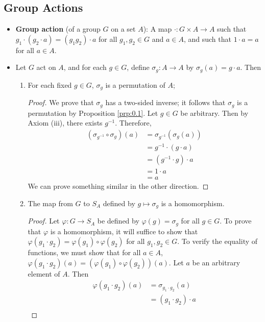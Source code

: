 \documentclass[../notes.tex]{subfiles}
\begin{document}
\subsection*{Group Actions}
\begin{itemize}
    \item \textbf{Group action} (of a group $G$ on a set $A$): A map $\cdot:G\times A\to A$ such that $g_1\cdot(g_2\cdot a)=(g_1g_2)\cdot a$ for all $g_1,g_2\in G$ and $a\in A$, and such that $1\cdot a=a$ for all $a\in A$.
    \item Let $G$ act on $A$, and for each $g\in G$, define $\sigma_g:A\to A$ by $\sigma_g(a)=g\cdot a$. Then
    \begin{enumerate}
        \item For each fixed $g\in G$, $\sigma_g$ is a permutation of $A$;
        \begin{proof}
            We prove that $\sigma_g$ has a two-sided inverse; it follows that $\sigma_g$ is a permutation by Proposition \ref{prp:0.1}. Let $g\in G$ be arbitrary. Then by Axiom (iii), there exists $g^{-1}$. Therefore,
            \begin{align*}
                (\sigma_{g^{-1}}\circ\sigma_g)(a) &= \sigma_{g^{-1}}(\sigma_g(a))\\
                &= g^{-1}\cdot(g\cdot a)\\
                &= (g^{-1}\cdot g)\cdot a\\
                &= 1\cdot a\\
                &= a
            \end{align*}
            We can prove something similar in the other direction.
        \end{proof}
        \item The map from $G$ to $S_A$ defined by $g\mapsto\sigma_g$ is a homomorphism.
        \begin{proof}
            Let $\varphi:G\to S_A$ be defined by $\varphi(g)=\sigma_g$ for all $g\in G$. To prove that $\varphi$ is a homomorphism, it will suffice to show that $\varphi(g_1\cdot g_2)=\varphi(g_1)\circ\varphi(g_2)$ for all $g_1,g_2\in G$. To verify the equality of functions, we must show that for all $a\in A$, $\varphi(g_1\cdot g_2)(a)=(\varphi(g_1)\circ\varphi(g_2))(a)$. Let $a$ be an arbitrary element of $A$. Then
            \begin{align*}
                \varphi(g_1\cdot g_2)(a) &= \sigma_{g_1\cdot g_2}(a)\\
                &= (g_1\cdot g_2)\cdot a\\

\end{align*}
\end{proof}
\end{enumerate}
\end{itemize}
\end{document}
